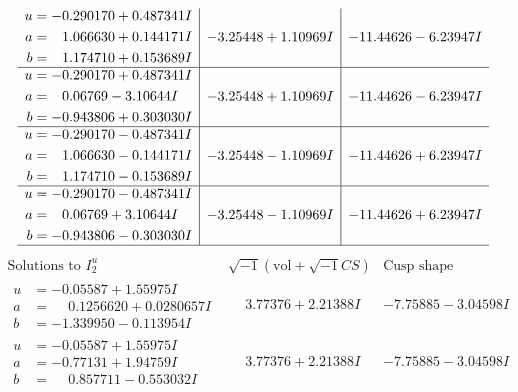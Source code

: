\documentclass[1p]{elsarticle_modified}
\theoremstyle{definition}
\newcommand{\I}{\sqrt{-1}}
\begin{document}
$$\begin{array}{c|c|c}
\begin{aligned}
u &= -0.290170 + 0.487341 I \\
a &= \phantom{-}1.066630 + 0.144171 I \\
b &= \phantom{-}1.174710 + 0.153689 I\end{aligned}
 & -3.25448 + 1.10969 I & -11.44626 - 6.23947 I \\ \hline\begin{aligned}
u &= -0.290170 + 0.487341 I \\
a &= \phantom{-}0.06769 - 3.10644 I \\
b &= -0.943806 + 0.303030 I\end{aligned}
 & -3.25448 + 1.10969 I & -11.44626 - 6.23947 I \\ \hline\begin{aligned}
u &= -0.290170 - 0.487341 I \\
a &= \phantom{-}1.066630 - 0.144171 I \\
b &= \phantom{-}1.174710 - 0.153689 I\end{aligned}
 & -3.25448 - 1.10969 I & -11.44626 + 6.23947 I \\ \hline\begin{aligned}
u &= -0.290170 - 0.487341 I \\
a &= \phantom{-}0.06769 + 3.10644 I \\
b &= -0.943806 - 0.303030 I\end{aligned}
 & -3.25448 - 1.10969 I & -11.44626 + 6.23947 I\\
 \hline 
 \end{array}$$\newpage$$\begin{array}{c|c|c}  
\text{Solutions to }I^u_{2}& \I (\text{vol} + \sqrt{-1}CS) & \text{Cusp shape}\\
 \hline 
\begin{aligned}
u &= -0.05587 + 1.55975 I \\
a &= \phantom{-}0.1256620 + 0.0280657 I \\
b &= -1.339950 - 0.113954 I\end{aligned}
 & \phantom{-}3.77376 + 2.21388 I & -7.75885 - 3.04598 I \\ \hline\begin{aligned}
u &= -0.05587 + 1.55975 I \\
a &= -0.77131 + 1.94759 I \\
b &= \phantom{-}0.857711 - 0.553032 I\end{aligned}
 & \phantom{-}3.77376 + 2.21388 I & -7.75885 - 3.04598 I \\ \hline\begin{aligned}

\end{aligned}
\end{array}$$
\end{document}
